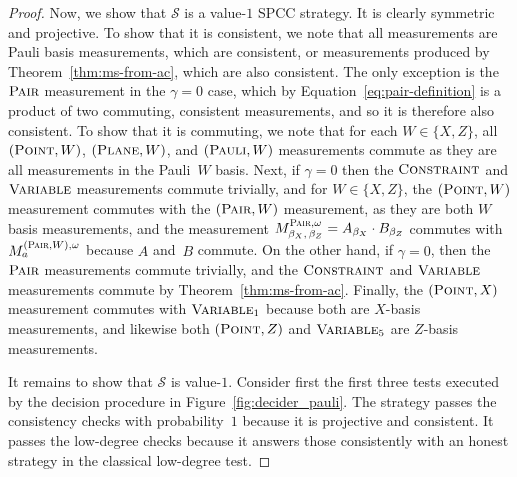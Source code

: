 \documentclass[11pt]{article}
\theoremstyle{definition}
\newcommand{\strategy}{\mathscr{S}}
\newcommand{\typestyle}[1]{\ensuremath{\textsc{#1}}\xspace}
\newcommand{\Plane}{\typestyle{Plane}}
\newcommand{\Point}{\typestyle{Point}}
\newcommand{\Pair}{\typestyle{Pair}}
\newcommand{\Constraint}{\typestyle{Constraint}}
\newcommand{\Variable}{\typestyle{Variable}}
\newcommand{\Pauli}{\typestyle{Pauli}}
\begin{document}
\begin{proof}
  Now, we show that $\strategy$ is a value-$1$ SPCC strategy.
  It is clearly symmetric and projective. 
  To show that it is consistent, we note that all measurements are Pauli basis measurements, which are consistent,
  or measurements produced by Theorem~\ref{thm:ms-from-ac}, which are also consistent.
  The only exception is the $\Pair$ measurement in the $\gamma = 0$ case, which by Equation~\eqref{eq:pair-definition}
  is a product of two commuting, consistent measurements, and so it is therefore also consistent.
  To show that it is commuting,
  we note that for each $W \in \{X, Z\}$, all $(\Point, W)$, $(\Plane, W)$, and $(\Pauli, W)$ measurements commute
  as they are all measurements in the Pauli~$W$ basis.
  Next, if $\gamma = 0$ then the $\Constraint$ and $\Variable$ measurements commute trivially,
  and for $W \in \{X, Z\}$, the $(\Point, W)$ measurement commutes with the $(\Pair, W)$ measurement,
  as they are both $W$ basis measurements,
  and the measurement $M^{\Pair, \omega}_{\beta_X, \, \beta_Z} = A_{\beta_X}\cdot B_{\beta_Z}$ 
  commutes with $M^{(\Pair, W), \omega}_{a}$ because $A$ and~$B$ commute.
  On the other hand, if $\gamma = 0$, then the $\Pair$ measurements commute trivially,
  and the $\Constraint$ and $\Variable$ measurements commute by Theorem~\ref{thm:ms-from-ac}.
  Finally, the $(\Point, X)$ measurement commutes with $\Variable_1$ because both are $X$-basis measurements,
  and likewise both $(\Point, Z)$ and $\Variable_5$ are $Z$-basis measurements.
  
  It remains to show that $\strategy$ is value-$1$.
	Consider first the first three tests executed by the decision procedure in
  Figure~\ref{fig:decider_pauli}.
  The strategy passes the consistency checks with probability~$1$ because it is
  projective and consistent.
  It passes the low-degree checks because it answers those consistently with an
  honest strategy in the classical low-degree test.
		

\end{proof}
\end{document}

